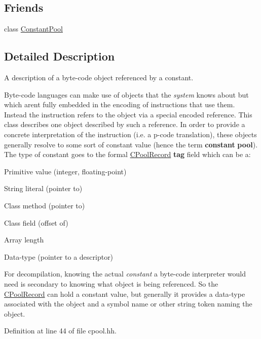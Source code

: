 \subsection*{Friends}
\begin{DoxyCompactItemize}
\item 
class \mbox{\hyperlink{class_c_pool_record_a9082967f4fe2577fe0a80c797675065d}{Constant\+Pool}}
\end{DoxyCompactItemize}


\subsection{Detailed Description}
A description of a byte-\/code object referenced by a constant. 

Byte-\/code languages can make use of objects that the {\itshape system} knows about but which aren\textquotesingle{}t fully embedded in the encoding of instructions that use them. Instead the instruction refers to the object via a special encoded reference. This class describes one object described by such a reference. In order to provide a concrete interpretation of the instruction (i.\+e. a p-\/code translation), these objects generally resolve to some sort of constant value (hence the term {\bfseries{constant}} {\bfseries{pool}}). The type of constant goes to the formal \mbox{\hyperlink{class_c_pool_record}{C\+Pool\+Record}} {\bfseries{tag}} field which can be a\+:
\begin{DoxyItemize}
\item Primitive value (integer, floating-\/point)
\item String literal (pointer to)
\item Class method (pointer to)
\item Class field (offset of)
\item Array length
\item Data-\/type (pointer to a descriptor)
\end{DoxyItemize}

For decompilation, knowing the actual {\itshape constant} a byte-\/code interpreter would need is secondary to knowing what object is being referenced. So the \mbox{\hyperlink{class_c_pool_record}{C\+Pool\+Record}} can hold a constant value, but generally it provides a data-\/type associated with the object and a symbol name or other string token naming the object. 

Definition at line 44 of file cpool.\+hh.



